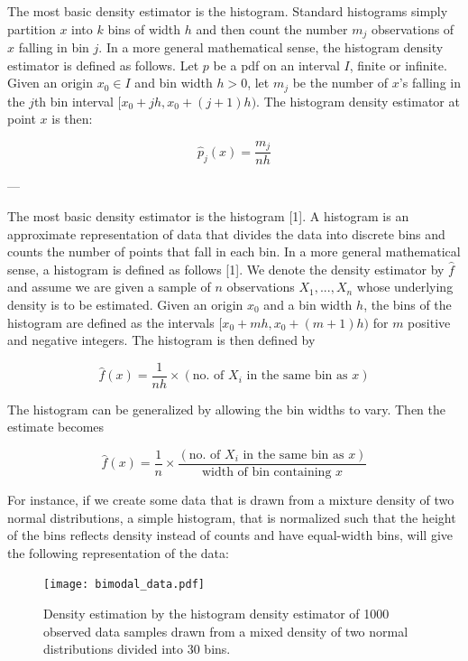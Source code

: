 The most basic density estimator is the histogram. Standard histograms simply partition $x$ into $k$ bins of width $h$ and then count the number $m_j$ observations of $x$ falling in bin $j$. In a more general mathematical sense, the histogram density estimator is defined as follows. Let $p$ be a pdf on an interval $I$, finite or infinite. Given an origin $x_0 \in I$ and bin width $h>0$, let $m_j$ be the number of $x$'s falling in the $j$th bin interval  $[x_0 + jh, x_0 + (j+1)h)$. The histogram density estimator at point $x$ is then:

\begin{equation*}
    \hat{p}_j(x) = \frac{m_j}{n h}
\end{equation*}


---

The most basic density estimator is the histogram [1]. A histogram is an approximate representation of data that divides the data into discrete bins and counts the number of points that fall in each bin. In a more general mathematical sense, a histogram is defined as follows [1]. We denote the density estimator by $\hat{f}$ and assume we are given a sample of $n$ observations $X_1, ..., X_n$ whose underlying density is to be estimated. Given an origin $x_0$ and a bin width $h$, the bins of the histogram are defined as the intervals $[x_0 + mh, x_0 + (m+1)h)$ for $m$ positive and negative integers. The histogram is then defined by

\begin{equation*}
    \hat{f}(x) = \frac{1}{nh} \times (\text{no. of } X_i \text{ in the same bin as } x)
\end{equation*}

The histogram can be generalized by allowing the bin widths to vary. Then the estimate becomes 

\begin{equation*}
    \hat{f}(x) = \frac{1}{n} \times \frac{(\text{no. of } X_i \text{ in the same bin as } x)}{\text{width of bin containing }x}
\end{equation*}

For instance, if we create some data that is drawn from a mixture density of two normal distributions, a simple  histogram, that is normalized such that the height of the bins reflects density instead of counts and have equal-width bins, will give the following representation of the data: 

\begin{figure}[H]
    \centering
    \texttt{[image: bimodal\_data.pdf]}
    \caption{Density estimation by the histogram density estimator of 1000 observed data samples drawn from a mixed density of two normal distributions divided into 30 bins.}
    \label{fig:bimodal_data}
\end{figure}

